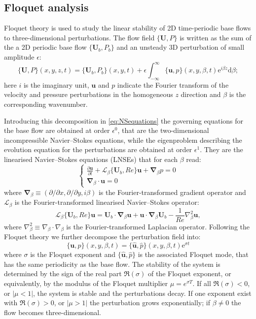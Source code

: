 \documentclass{jfm}
\begin{document}
\subsection{Floquet analysis}

Floquet theory is used to study the linear stability of 2D time-periodic base flows to three-dimensional perturbations. The flow field $\{\bm{U},P\}$ is written as the sum of the a 2D periodic base flow $\{\bm{U}_b,P_b\}$ and an unsteady 3D perturbation of small amplitude $\epsilon$:
\begin{equation}
\{\bm{U},P\}(x,y,z,t) = \{\bm{U}_b,P_b\}(x,y,t) + \epsilon \int_{-\infty}^{\infty} \{\bm{u},p\}(x,y,\beta,t) \text{e}^{i \beta z} \text{d} \beta;
\end{equation}
here $i$ is the imaginary unit, $\bm{u}$ and $p$ indicate the Fourier transform of the velocity and pressure perturbations in the homogeneous $z$ direction and $\beta$ is the corresponding wavenumber.

Introducing this decomposition in \ref{eq:NSequations} the governing equations for the base flow are obtained at order $\epsilon^0$, that are the two-dimensional incompressible Navier--Stokes equations, while the eigenproblem describing the evolution equation for the perturbations are obtained at order $\epsilon^1$. They are the linearised Navier--Stokes equations (LNSEs) that for each $\beta$ read:
%
\begin{equation}
\begin{cases}
\frac{\partial \bm{u}}{\partial t} + \mathcal{L}_\beta\{\bm{U}_b,Re\}\bm{u} + \bm{\nabla}_\beta p = 0 \\
\bm{\nabla}_\beta \cdot \bm{u} = 0
\end{cases}
\label{eq:LNSEs}
\end{equation}
%
where $\bm{\nabla}_\beta \equiv (\partial / \partial x,\partial / \partial y, i\beta)$ is the Fourier-transformed gradient operator and $\mathcal{L}_\beta$ is the Fourier-transformed linearised Navier--Stokes operator:
%
\begin{equation}
\mathcal{L}_\beta\{\bm{U}_b,Re\}\bm{u}=\bm{U}_b \cdot \bm{\nabla}_\beta \bm{u} + \bm{u} \cdot \bm{\nabla}_\beta \bm{U}_b - \frac{1}{Re} \nabla^2_\beta \bm{u},
\end{equation}
%
where $\nabla^2_\beta \equiv \nabla_\beta \cdot \nabla_\beta$ is the Fourier-transformed Laplacian operator. Following the Floquet theory we further decompose the perturbation field into:
%
\begin{equation}
\{\bm{u},p\}(x,y,\beta,t) = \{\hat{\bm{u}},\hat{p}\}(x,y,\beta,t) \text{e}^{\sigma t}
\end{equation}
%
where $\sigma$ is the Floquet exponent and $\{ \hat{\bm{u}},\hat{p} \}$ is the associated Floquet mode, that has the same periodicity as the base flow. The stability of the system is determined by the sign of the real part $\Re(\sigma)$ of the Floquet exponent, or equivalently, by the modulus of the Floquet multiplier $\mu = e^{\sigma T}$. If all $\Re(\sigma)<0$, or $|\mu<1|$, the system is stable and the perturbations decay. If one exponent exist with $\Re(\sigma)>0$, or $|\mu>1|$ the perturbation grows exponentially; if $\beta \neq 0$ the flow becomes three-dimensional.
\end{document}
